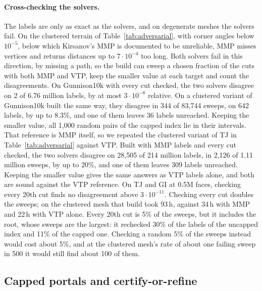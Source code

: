 \documentclass[sigconf,nonacm,screen]{acmart}
\begin{document}
\paragraph{Cross-checking the solvers.}
The labels are only as exact as the solvers, and on degenerate meshes the solvers fail. On the clustered terrain
of Table~\ref{tab:adversarial}, with corner angles below $10^{-5}$, below which Kirsanov's MMP is documented to be
unreliable, MMP misses vertices and returns distances up to $7\cdot10^{-4}$ too long. Both solvers fail in this
direction, by missing a path, so the build can sweep a chosen fraction of the cuts with both MMP and VTP, keep the
smaller value at each target and count the disagreements. On Gunnison10k with every cut checked, the two solvers
disagree on 2 of 6.76 million labels, by at most $3\cdot10^{-8}$ relative. On a clustered variant of Gunnison10k
built the same way, they disagree in 344 of 83,744 sweeps, on 642 labels, by up to 8.3\%, and one of them leaves
36 labels unreached. Keeping the smaller value, all 1,000 random pairs of the capped index lie in their intervals.
That reference is MMP itself, so we repeated the clustered variant of TJ in Table~\ref{tab:adversarial} against VTP.
Built with MMP labels and every cut checked, the two solvers disagree on 28,505 of 214 million labels, in 2,126 of
1.11 million sweeps, by up to 20\%, and one of them leaves 309 labels unreached. Keeping the smaller value gives the
same answers as VTP labels alone, and both are sound against the VTP reference. On TJ and GI at 0.5M faces, checking
every 20th cut finds no disagreement above $3\cdot10^{-11}$. Checking every cut doubles the sweeps; on the clustered mesh
that build took 93\,h, against 34\,h with MMP and 22\,h with VTP alone. Every 20th cut is 5\% of the sweeps, but it includes the root, whose
sweeps are the largest: it rechecked 30\% of the labels of the uncapped index and 11\% of the capped one.
Checking a random 5\% of the sweeps instead would cost about 5\%, and at the clustered mesh's rate of about one
failing sweep in 500 it would still find about 100 of them.

\subsection{Capped portals and certify-or-refine}
\label{sec:capped}
\end{document}
